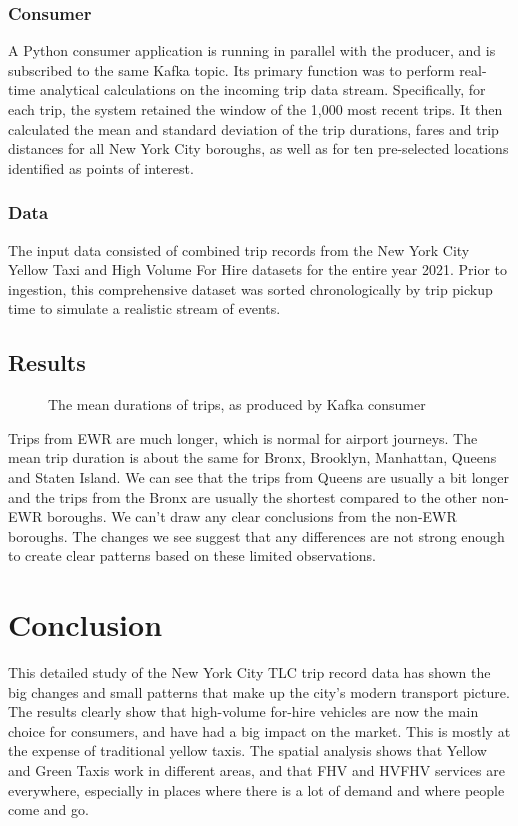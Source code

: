 \documentclass[conference]{IEEEtran}
\begin{document}
\subsubsection*{Consumer} A Python consumer application is running in parallel with the producer, and is subscribed to
the same Kafka topic. Its primary function was to perform real-time analytical calculations on the incoming trip data
stream. Specifically, for each trip, the system retained the window of the 1,000 most recent trips. It then calculated
the mean and standard deviation of the trip durations, fares and trip distances for all New York City boroughs, as well
as for ten pre-selected locations identified as points of interest.

\subsubsection*{Data} The input data consisted of combined trip records from the New York City Yellow Taxi and High
Volume For Hire datasets for the entire year 2021. Prior to ingestion, this comprehensive dataset was sorted
chronologically by trip pickup time to simulate a realistic stream of events.

\subsection{Results}

\begin{figure}[htbp]
  \label{fig:kafka-mean-trip-duration}
  \centering
  
  \caption{The mean durations of trips, as produced by Kafka consumer}
\end{figure}

Trips from EWR are much longer, which is normal for airport journeys. The mean trip duration is about the same for
Bronx, Brooklyn, Manhattan, Queens and Staten Island. We can see that the trips from Queens are usually a bit longer
and the trips from the Bronx are usually the shortest compared to the other non-EWR boroughs. We can't draw any clear
conclusions from the non-EWR boroughs. The changes we see suggest that any differences are not strong enough to create
clear patterns based on these limited observations.

\section{Conclusion}
This detailed study of the New York City TLC trip record data has shown the big changes and small patterns that make up
the city's modern transport picture. The results clearly show that high-volume for-hire vehicles are now the main choice
for consumers, and have had a big impact on the market. This is mostly at the expense of traditional yellow taxis. The
spatial analysis shows that Yellow and Green Taxis work in different areas, and that FHV and HVFHV services are
everywhere, especially in places where there is a lot of demand and where people come and go.
\end{document}

